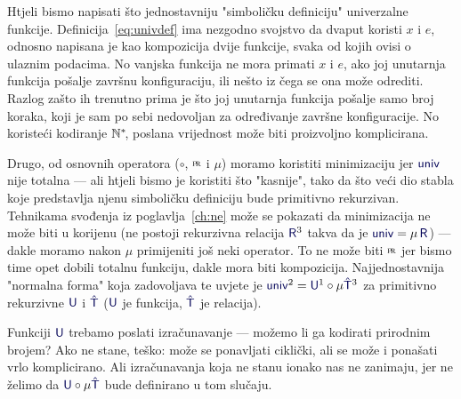 Htjeli bismo napisati što jednostavniju "simboličku definiciju" univerzalne funkcije. Definicija~\eqref{eq:univdef} ima nezgodno svojstvo da dvaput koristi $x$ i $e$, odnosno napisana je kao kompozicija dvije funkcije, svaka od kojih ovisi o ulaznim podacima. No vanjska funkcija ne mora primati $x$ i $e$, ako joj unutarnja funkcija pošalje završnu konfiguraciju, ili nešto iz čega se ona može odrediti. Razlog zašto ih trenutno prima je što joj unutarnja funkcija pošalje samo broj koraka, koji je sam po sebi nedovoljan za određivanje završne konfiguracije. No koristeći kodiranje ${\mathbb N}^*\!$, poslana vrijednost može biti proizvoljno komplicirana.

Drugo, od osnovnih operatora ($\circ$, $\pr$ i $\mu$) moramo koristiti minimizaciju jer $\f{univ}$ nije totalna --- ali htjeli bismo je koristiti što "kasnije", tako da što veći dio stabla koje predstavlja njenu simboličku definiciju bude primitivno rekurzivan. Tehnikama svođenja iz poglavlja~\ref{ch:ne} može se pokazati da minimizacija ne može biti u korijenu (ne postoji rekurzivna relacija $\f{R}^3$ takva da je $\f{univ}=\mu\,\f{R}$) --- dakle moramo nakon $\mu$ primijeniti još neki operator. To ne može biti $\pr$ jer bismo time opet dobili totalnu funkciju, dakle mora biti kompozicija. Najjednostavnija "normalna forma" koja zadovoljava te uvjete je $\f{univ}^2=\f U^1\circ\mu\f{\hat T}^3$ za primitivno rekurzivne $\f U$ i $\f{\hat T}$ ($\f U$ je funkcija, $\f{\hat T}$ je relacija).


Funkciji $\f U$ trebamo poslati izračunavanje --- možemo li ga kodirati prirodnim brojem? Ako ne stane, teško: može se ponavljati ciklički, ali se može i ponašati vrlo komplicirano. Ali izračunavanja koja ne stanu ionako nas ne zanimaju, jer ne želimo da $\f U\circ\mu\f{\hat T}$ bude definirano u tom slučaju.

